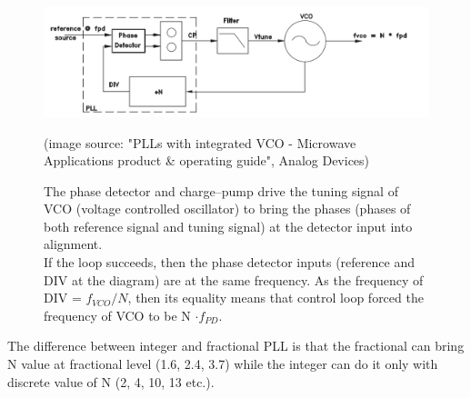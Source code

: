 \documentclass[eng,printmode]{mgr}
\begin{document}
\begin{figure}[!h]
{	
	\centering 	
	\includegraphics[width=1\linewidth]{pll3}}
	\caption{The phase detector and charge--pump drive the tuning signal of VCO (voltage controlled oscillator) to bring the phases (phases of both reference signal and tuning signal) at the detector input into alignment.\\
	If the loop succeeds, then the phase detector inputs (reference and DIV at the diagram) are at the same frequency. 
	As the frequency of DIV = $f_{VCO} / N$, then its equality means that control loop forced the frequency of VCO to be N $\cdot f_{PD}$.}
	\hspace{20pt}

	(image source: "PLLs with integrated VCO - Microwave Applications
	product \& operating guide", Analog Devices)
\label{fig:pll3}
\end{figure}
\vspace{20pt}
The difference between integer and fractional PLL is that the fractional can bring N value at fractional level (1.6, 2.4, 3.7) while the integer can do it only with discrete value of N (2, 4, 10, 13 etc.).

\newpage
\end{document}
